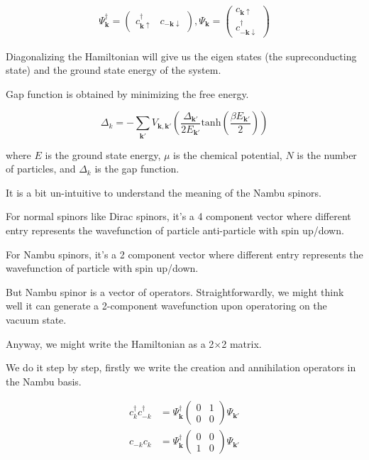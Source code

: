 \documentclass[14pt, a4paper]{extarticle}
\begin{document}
\begin{align}
    \Psi_{\mathbf{k}}^{\dagger} = \begin{pmatrix} c_{\mathbf{k}\uparrow}^{\dagger} & c_{-\mathbf{k}\downarrow} \end{pmatrix},
    \Psi_{\mathbf{k}} = \begin{pmatrix} c_{\mathbf{k}\uparrow} \\ c_{-\mathbf{k}\downarrow}^\dagger \end{pmatrix}
\end{align}

Diagonalizing the Hamiltonian will give us the eigen states (the supreconducting state) and the ground state energy of the system.

Gap function is obtained by minimizing the free energy.

\begin{equation}
    \Delta_{k} = -\sum_{\mathbf{k'}} V_{\mathbf{k}, \mathbf{k'}} \left( \frac{\Delta_{\mathbf{k'}}}{2 E_{\mathbf{k'}}} \text{tanh}(\frac{\beta E_{\mathbf{k'}}}{2})\right)
\end{equation}

where $E$ is the ground state energy, $\mu$ is the chemical potential, $N$ is the number of particles, and $\Delta_{k}$ is the gap function.


It is a bit un-intuitive to understand the meaning of the Nambu spinors.

For normal spinors like Dirac spinors, it's a 4 component vector where different
entry represents the wavefunction of particle anti-particle with spin up/down.

For Nambu spinors, it's a 2 component vector where different
entry represents the wavefunction of particle with spin up/down.

But Nambu spinor is a vector of operators. Straightforwardly, we might think well it can
generate a 2-component wavefunction upon operatoring on the vacuum state.

Anyway, we might write the Hamiltonian as a 2$\times$2 matrix.

We do it step by step, firstly we write the creation and annihilation operators in the Nambu basis.

\begin{align}
    c_{k}^\dagger c_{-k}^\dagger & = \Psi_{\mathbf{k}}^{\dagger} \begin{pmatrix} 0 & 1 \\ 0 & 0 \end{pmatrix} \Psi_{\mathbf{k'}} \\
    c_{ -k} c_{k} & = \Psi_{\mathbf{k}}^{\dagger} \begin{pmatrix} 0 & 0 \\ 1 & 0 \end{pmatrix} \Psi_{\mathbf{k'}} \\
\end{align}
\end{document}
